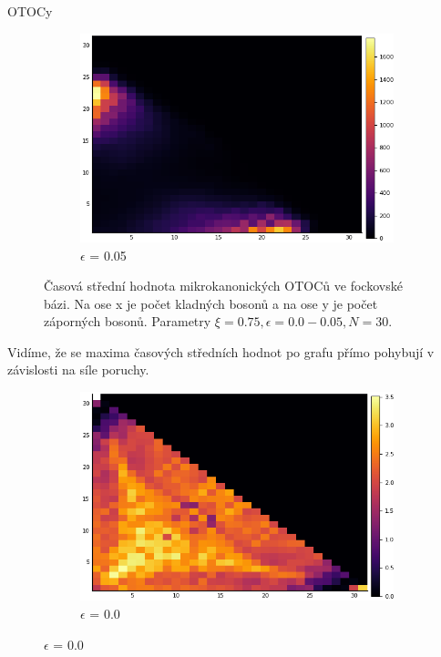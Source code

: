 \documentclass{article}
\begin{document}
\begin{section}{OTOCy}
\begin{figure}[H]
\begin{subfigure}{.33\textwidth}
  
                              \end{subfigure}%
                              \begin{subfigure}{.33\textwidth}
                                \centering
                                \includegraphics[width=1.0\linewidth]{6.png}
                              \caption{$\epsilon$ = 0.05}

                            \end{subfigure}


                            \caption{Časová střední hodnota mikrokanonických OTOCů ve fockovské bázi. Na ose x je počet kladných bosonů a na 
                            ose y je počet záporných bosonů. Parametry $\xi = 0.75, \epsilon = 0.0 - 0.05, N = 30$.}
                            \end{figure}

                            Vidíme, že se maxima časových středních hodnot po grafu přímo pohybují v závislosti na síle poruchy. 


                            \begin{figure}[H]
                                \begin{subfigure}{.33\textwidth}
                                  \centering
                                  \includegraphics[width=1.0\linewidth]{HM1.png}
                                  \caption{$\epsilon$ = 0.0}
                                 

\end{subfigure}
\end{figure}
\end{section}
\end{document}
